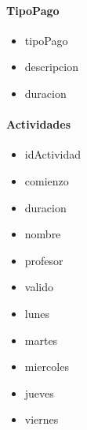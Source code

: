 \documentclass[a4paper, 12pt, spanish]{report}
\begin{document}
\begin{multicols}{3}
	\paragraph{TipoPago}
	\begin{itemize}
		\item tipoPago
		\item descripcion
		\item duracion
	\end{itemize}
	
	\paragraph{Actividades}
	\begin{itemize}
		\item idActividad
		\item comienzo
		\item duracion
		\item nombre
		\item profesor
		\item valido
		\item lunes
		\item martes
		\item miercoles
		\item jueves
		\item viernes
	\end{itemize}
\end{multicols}
\end{document}
